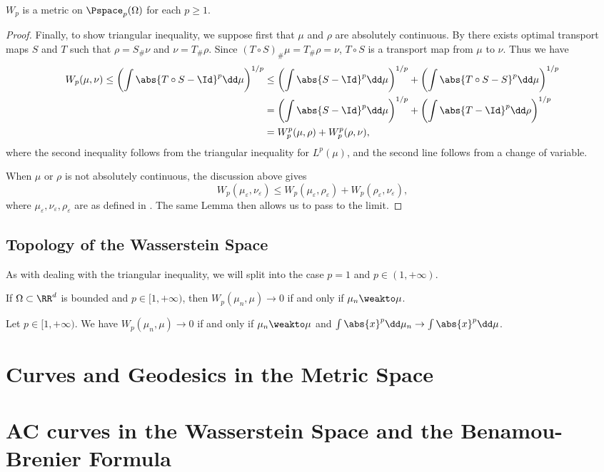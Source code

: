 \documentclass[oneside,reqno,letterpaper]{amsart}
\begin{document}
\begin{theorem}
  \(W_p\) is a metric on \(\Pspace_p(\Omega)\) for each \(p \geq 1\).
\end{theorem}
\begin{proof}
  Finally, to show triangular inequality, we suppose first that \(\mu\) and \(\rho\) are absolutely continuous.
  By  there exists optimal transport maps \(S\) and \(T\) such that \(\rho = S_{\#} \nu\) and \(\nu = T_{\#} \rho\).
  Since \((T \circ S)_{\#} \mu = T_{\#} \rho = \nu\), \(T \circ S\) is a transport map from \(\mu\) to \(\nu\).
  Thus we have
  \begin{align*}
    W_p(\mu, \nu)
    \leq \left( \int \abs{T \circ S - \Id}^p \dd \mu \right)^{1 / p}
    &\leq \left( \int \abs{S - \Id}^p \dd \mu \right)^{1 / p} + \left( \int \abs{T \circ S - S}^p \dd \mu \right)^{1 / p} \\
    &= \left( \int \abs{S - \Id}^p \dd \mu \right)^{1 / p} + \left( \int \abs{T - \Id}^p \dd \rho \right)^{1 / p} \\
    &= W_p^p(\mu, \rho) + W_p^p(\rho, \nu),
  \end{align*}
  where the second inequality follows from the triangular inequality for \(L^p(\mu)\), and the second line follows from a change of variable.

  When \(\mu\) or \(\rho\) is not absolutely continuous, the discussion above gives
  \[
    W_p(\mu_{\varepsilon}, \nu_{\varepsilon})
    \leq W_p(\mu_{\varepsilon}, \rho_{\varepsilon}) + W_p(\rho_{\varepsilon}, \nu_{\varepsilon}),
  \]
  where \(\mu_{\varepsilon}, \nu_{\varepsilon}, \rho_{\varepsilon}\) are as defined in .
  The same Lemma then allows us to pass to the limit.
\end{proof}


\subsection{Topology of the Wasserstein Space}
As with dealing with the triangular inequality, we will split into the case \(p = 1\) and \(p \in (1, +\infty)\).

\begin{theorem}
  If \(\Omega \subset \RR^d\) is bounded and \(p \in [1, +\infty)\), then \(W_p(\mu_n, \mu) \to 0\) if and only if \(\mu_n \weakto \mu\).
\end{theorem}


\begin{theorem}
  Let \(p \in [1, +\infty)\).
  We have \(W_p(\mu_n, \mu) \to 0\) if and only if \(\mu_n \weakto \mu\) and \(\int \abs{x}^p \dd \mu_n \to \int \abs{x}^p \dd \mu\).
\end{theorem}






\section{Curves and Geodesics in the Metric Space}




\section{AC curves in the Wasserstein Space and the Benamou-Brenier Formula}
\end{document}
